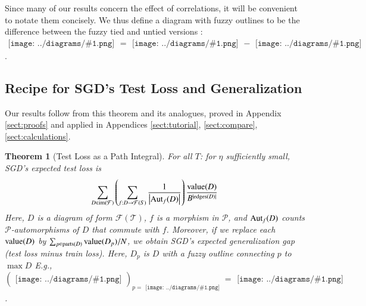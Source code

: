 \documentclass{article}
\newtheorem{thm}{Theorem}
\newcommand{\Free}{\mathcal{F}}
\newcommand{\Aut}{\text{\textnormal{Aut}}}
\newcommand{\image}{\text{\textnormal{im}}}
\newcommand{\dvalue}{\text{\textnormal{value}}}
\newcommand{\edges}{\text{\textnormal{edges}}}
\newcommand{\parts}{\text{\textnormal{parts}}}
\newcommand{\Pp}{\mathcal{P}}
\newcommand{\Tt}{\mathcal{T}}
\newcommand{\wrap}[1]{\left(#1\right)}
\newcommand{\wabs}[1]{\left|#1\right|}
\newcommand{\sdia}[1]{\begin{gathered}\texttt{[image: ../diagrams/\#1.png]}\end{gathered}}
\begin{document}
        Since many of our results concern the effect of correlations, it will
        be convenient to notate them concisely.  We thus define a diagram with
        fuzzy outlines to be the difference between the fuzzy tied and untied
        versions : $\sdia{c(01-2)(01-12)} =
        \sdia{(01-2)(01-12)}-\sdia{(0-1-2)(01-12)}$.  
            

    \subsection{Recipe for SGD's Test Loss and Generalization}
        Our results follow from this theorem and its analogues, proved in
        Appendix \ref{sect:proofs} and applied in Appendices
        \ref{sect:tutorial},
        \ref{sect:compare},
        \ref{sect:calculations}.
        \begin{thm}[Test Loss as a Path Integral] \label{thm:sgdcoef}
            For all $T$: for $\eta$ sufficiently small, SGD's expected test
            loss is
            \begin{equation}\label{eq:sgdcoef}
                \sum_{D \in \image(\Free)} \wrap{
                    \sum_{f: D\to\Free(S)}
                    \frac{1}{\wabs{\Aut_f(D)}}
                }
                \frac{\dvalue(D)}{B^{|\edges(D)|}}
            \end{equation}
            Here, $D$ is a diagram of form $\Free(\Tt)$, $f$ is a morphism in
            $\Pp$, and $\Aut_f(D)$ counts $\Pp$-automorphisms of $D$ that
            commute with $f$. 
            Moreover, if we replace each $\dvalue(D)$ by
            $
                \sum_{p \in \parts(D)} \dvalue(D_p)/N
            $, we obtain
            SGD's expected generalization gap (test loss minus train loss).
            Here, $D_p$ is $D$ with a fuzzy outline connecting $p$ to $\max D$
            E.g., $(\sdia{(0-1)(01)})_{p=\sdia{(0)()}} =
            \sdia{c(01)(01)}$.
        \end{thm}
    
\end{document}

